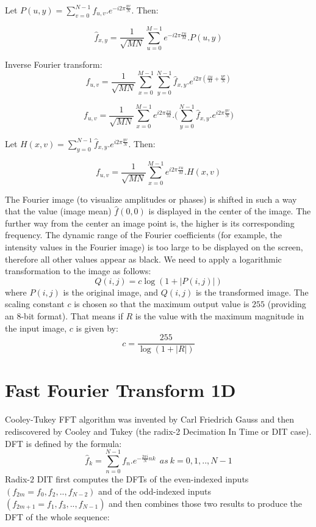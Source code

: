 \documentclass{article}
\begin{document}
Let $ P(u, y) = \sum\limits_{v = 0}^{N - 1} f_{u, v} . e^{-i2\pi \frac{yv}{N}} $. Then:

$$ \hat{f}_{x, y} = \frac{1}{\sqrt{MN}} \sum\limits_{u = 0}^{M - 1} e^{-i2\pi \frac{xu}{M}} . P(u, y) $$

Inverse Fourier transform:
$$ f_{u, v} = \frac{1}{\sqrt{MN}} \sum\limits_{x = 0}^{M - 1} \sum\limits_{y = 0}^{N - 1} \hat{f}_{x, y}.e^{i2\pi (\frac{xu}{M} + \frac{yv}{N})}$$

$$ f_{u, v} = \frac{1}{\sqrt{MN}} \sum\limits_{x = 0}^{M - 1} e^{i2\pi \frac{xu}{M}} . \bigg( \sum\limits_{y = 0}^{N - 1} \hat{f}_{x, y} . e^{i2\pi \frac{yv}{N}} \bigg) $$

Let $ H(x, v) = \sum\limits_{y = 0}^{N - 1} \hat{f}_{x, y} . e^{i2\pi \frac{yv}{N}} $. Then:

$$ f_{u, v} = \frac{1}{\sqrt{MN}} \sum\limits_{x = 0}^{M - 1} e^{i2\pi \frac{xu}{M}} . H(x, v) $$

The Fourier image (to visualize amplitudes or phases) is shifted in such a way that the value (image mean) $\hat{f}(0, 0)$ is displayed in the center of the image. The further way from the center an image point is, the higher is its corresponding frequency. The dynamic range of the Fourier coefficients (for example, the intensity values in the Fourier image) is too large to be displayed on the screen, therefore all other values appear as black. We need to apply a logarithmic transformation to the image as follows:
$$Q(i, j) = c \log(1 + |P(i, j)|)$$
where $P(i, j)$ is the original image, and $Q(i, j)$ is the transformed image. The scaling constant $c$ is chosen so that the maximum output value is $255$ (providing an $8$-bit format). That means if $R$ is the value with the maximum magnitude in the input image, $c$ is given by:
$$c = \frac{255}{\log(1 + |R|)}$$

\section{Fast Fourier Transform 1D}
Cooley-Tukey FFT algorithm was invented by Carl Friedrich Gauss and then rediscovered by Cooley and Tukey (the radix-2 Decimation In Time or DIT case). DFT is defined by the formula:
$$\hat{f}_k = \sum\limits_{n = 0}^{N - 1} f_n.e^{-\frac{2\pi i}{N}nk} \ \ as \ k = 0, 1, .., N - 1$$
Radix-$2$ DIT first computes the DFTs of the even-indexed inputs $(f_{2m} = f_0, f_2, .., f_{N - 2})$ and of the odd-indexed inputs $(f_{2m + 1} = f_1, f_3, .., f_{N - 1})$ and then combines those two results to produce the DFT of the whole sequence:
\end{document}

